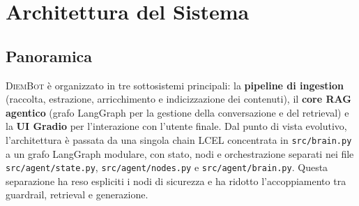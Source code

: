 \documentclass[11pt,a4paper]{article}
\newcommand{\code}[1]{\texttt{\small#1}}
\newcommand{\sys}{\textsc{DiemBot}}
\begin{document}
\section{Architettura del Sistema}
\label{sec:architettura}

\subsection{Panoramica}

\sys{} è organizzato in tre sottosistemi principali: la \textbf{pipeline di ingestion}
(raccolta, estrazione, arricchimento e indicizzazione dei contenuti), il \textbf{core RAG
agentico} (grafo LangGraph per la gestione della conversazione e del retrieval) e la
\textbf{UI Gradio} per l'interazione con l'utente finale.
Dal punto di vista evolutivo, l'architettura è passata da una singola chain LCEL
concentrata in \code{src/brain.py} a un grafo LangGraph modulare, con stato, nodi e
orchestrazione separati nei file \code{src/agent/state.py}, \code{src/agent/nodes.py}
e \code{src/agent/brain.py}. Questa separazione ha reso espliciti i nodi di sicurezza
e ha ridotto l'accoppiamento tra guardrail, retrieval e generazione.
\end{document}
